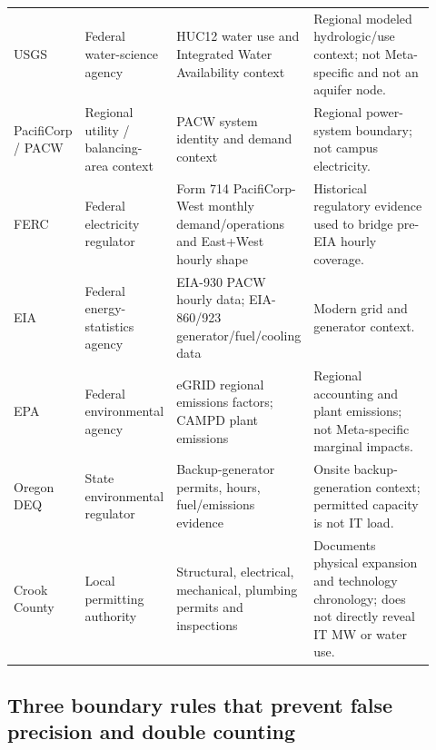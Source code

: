 \documentclass[11pt]{article}
\begin{document}
\begin{longtable}{@{}p{0.15\linewidth}p{0.20\linewidth}p{0.23\linewidth}p{0.34\linewidth}@{}}
USGS & Federal water-science agency & HUC12 water use and Integrated Water Availability context & Regional modeled hydrologic/use context; not Meta-specific and not an aquifer node. \\
PacifiCorp / PACW & Regional utility / balancing-area context & PACW system identity and demand context & Regional power-system boundary; not campus electricity. \\
FERC & Federal electricity regulator & Form 714 PacifiCorp-West monthly demand/operations and East+West hourly shape & Historical regulatory evidence used to bridge pre-EIA hourly coverage. \\
EIA & Federal energy-statistics agency & EIA-930 PACW hourly data; EIA-860/923 generator/fuel/cooling data & Modern grid and generator context. \\
EPA & Federal environmental agency & eGRID regional emissions factors; CAMPD plant emissions & Regional accounting and plant emissions; not Meta-specific marginal impacts. \\
Oregon DEQ & State environmental regulator & Backup-generator permits, hours, fuel/emissions evidence & Onsite backup-generation context; permitted capacity is not IT load. \\
Crook County & Local permitting authority & Structural, electrical, mechanical, plumbing permits and inspections & Documents physical expansion and technology chronology; does not directly reveal IT MW or water use. \\
\bottomrule
\end{longtable}
\par{}
\endgroup

\subsection*{Three boundary rules that prevent false precision and double counting}
\end{document}

